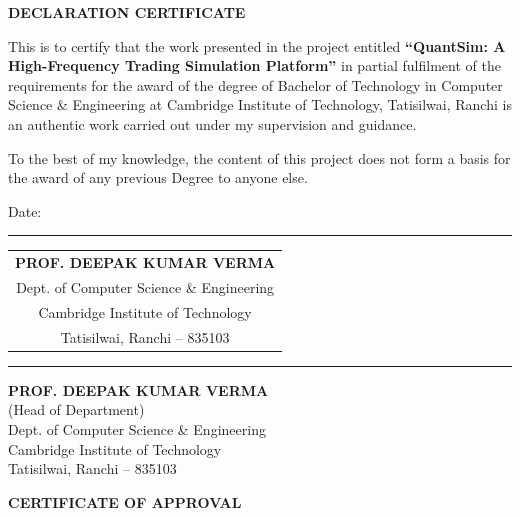 \documentclass[12pt,oneside,a4paper]{report}
\begin{document}
\begin{titlepage}
\end{titlepage}

\clearpage
\begin{center}
{\Large\bfseries DECLARATION CERTIFICATE}
\end{center}
\vspace{0.4in}

This is to certify that the work presented in the project entitled \textbf{``QuantSim: A High-Frequency Trading Simulation Platform''} in partial fulfilment of the requirements for the award of the degree of Bachelor of Technology in Computer Science \& Engineering at Cambridge Institute of Technology, Tatisilwai, Ranchi is an authentic work carried out under my supervision and guidance.

\vspace{0.25in}

To the best of my knowledge, the content of this project does not form a basis for the award of any previous Degree to anyone else.

\vspace{0.9in}

Date: \rule{1.8in}{0.4pt} \hfill
\begin{tabular}[t]{c}
\textbf{PROF. DEEPAK KUMAR VERMA} \\
Dept. of Computer Science \& Engineering \\
Cambridge Institute of Technology \\
Tatisilwai, Ranchi -- 835103
\end{tabular}

\vspace{0.3in}
\noindent\rule{\textwidth}{0.4pt}
\vspace{0.7in}

\begin{center}
\textbf{PROF. DEEPAK KUMAR VERMA} \\
(Head of Department) \\
Dept. of Computer Science \& Engineering \\
Cambridge Institute of Technology \\
Tatisilwai, Ranchi -- 835103
\end{center}

\clearpage
\begin{center}
{\Large\bfseries CERTIFICATE OF APPROVAL}
\end{center}
\vspace{0.3in}
\end{document}
